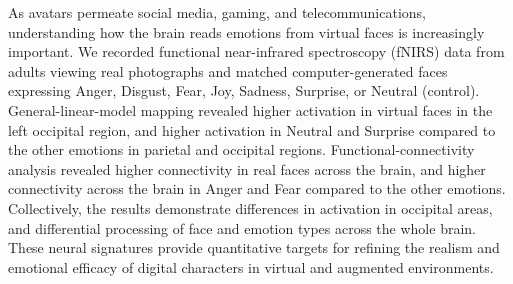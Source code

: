As avatars permeate social media, gaming, and telecommunications, understanding how the brain reads emotions from virtual faces is increasingly important. 
We recorded functional near-infrared spectroscopy (fNIRS) data from adults viewing real photographs and matched computer-generated faces expressing Anger, Disgust, Fear, Joy, Sadness, Surprise, or Neutral (control). 
General-linear-model mapping revealed higher activation in virtual faces in the left occipital region, and higher activation in Neutral and Surprise compared to the other emotions in parietal and occipital regions. 
Functional-connectivity analysis revealed higher connectivity in real faces across the brain, and higher connectivity across the brain in Anger and Fear compared to the other emotions. 
Collectively, the results demonstrate differences in activation in occipital areas, and differential processing of face and emotion types across the whole brain.  
These neural signatures provide quantitative targets for refining the realism and emotional efficacy of digital characters in virtual and augmented environments.